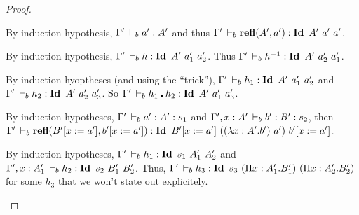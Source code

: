 \documentclass[a4paper,english]{lipics-utf8x}
\begin{document}
\begin{proof}
\begin{caselist}
      \begin{graycase}
        \begin{mathc}
        \end{mathc}
        By induction hypothesis, $\Gamma' \,\vdash_b a' : A'$ and thus
        $\Gamma' \,\vdash_b \operatorname{\mathbf{refl}}(A',a') : \operatorname{\mathbf{Id}~} A'\ a'\ a'$.
      \end{graycase}

      \begin{graycase}
        \begin{mathc}
        \end{mathc}
        By induction hypothesis, $\Gamma' \,\vdash_b h : \operatorname{\mathbf{Id}~} A'\ a'_1\ a'_2$.
        Thus $\Gamma' \,\vdash_b h^{-1} : \operatorname{\mathbf{Id}~} A'\ a'_2\ a'_1$.
      \end{graycase}

      \begin{graycase}
        \begin{mathc}
        \end{mathc}
        By induction hyoptheses (and using the ``trick''),
        $\Gamma' \,\vdash_b h_1 : \operatorname{\mathbf{Id}~} A'\ a'_1\ a'_2$ and
        $\Gamma' \,\vdash_b h_2 : \operatorname{\mathbf{Id}~} A'\ a'_2\ a'_3$.
        So $\Gamma' \,\vdash_b h_1 \centerdot h_2 : \operatorname{\mathbf{Id}~} A'\ a'_1\ a'_3$.
      \end{graycase}

      \begin{graycase}
        \begin{mathc}
        \end{mathc}
        By induction hypotheses, $\Gamma' \,\vdash_b a' : A' : s_1$ and
        $\Gamma', x:A' \,\vdash_b b' : B' : s_2$, then
        $\Gamma' \derb \refl(B'[x := a'], b'[x := a']) : \Id B'[x := a']\ %
        ((\lambda x:A'.b')\ a')\ b'[x := a']$.
      \end{graycase}

      \begin{graycase}
        \begin{mathc}
        \end{mathc}
        By induction hypotheses, $\Gamma' \,\vdash_b h_1 : \operatorname{\mathbf{Id}~} s_1\ A'_1\ A'_2$
        and $\Gamma', x:A'_1 \,\vdash_b h_2 : \operatorname{\mathbf{Id}~} s_2\ B'_1\ B'_2$.
        Thus,
        $\Gamma' \,\vdash_b h_3 : \operatorname{\mathbf{Id}~} s_3\ (\Pi x:A'_1.B'_1)\ (\Pi x:A'_2.B'_2)$
        for some $h_3$ that we won't state out explicitely.
      \end{graycase}


\end{caselist}
\end{proof}
\end{document}

